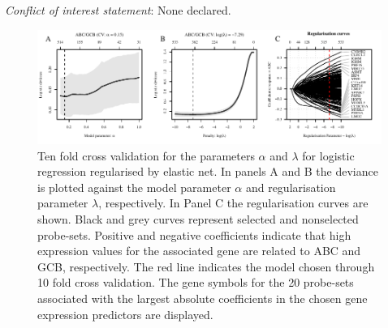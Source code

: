 \documentclass{article}
\begin{document}
\noindent\textit{Conflict of interest statement}: None declared.
{}




\begin{figure}[htb]
\begin{center}
\includegraphics[width=1\textwidth]{CrosvalidationClass.pdf}
\end{center}
\caption{Ten fold cross validation for the parameters $\alpha$ and $\lambda$ for logistic regression regularised by elastic net.
In panels A and B the deviance is plotted against the model parameter $\alpha$ and regularisation parameter $\lambda$, respectively.
In Panel C the regularisation curves are shown.
Black and grey curves represent selected and nonselected probe-sets.
Positive and negative coefficients indicate that high expression values for the associated gene are related to ABC and GCB, respectively.
The red line indicates the model chosen through 10 fold cross validation.
The gene symbols for the 20 probe-sets associated with the largest absolute coefficients in the chosen gene expression predictors are displayed.}
\label{fig:crossval}
\end{figure}
\end{document}
